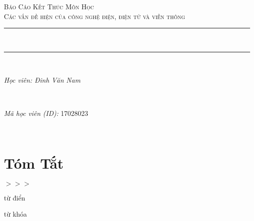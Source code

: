 \documentclass{article}
\author{Linus C. Brendel}								%
\date{\today}											%
\begin{document}
	

\begin{titlepage}
	\centering
	\vspace*{0.5 cm}
	\textsc{\LARGE Báo Cáo Kết Thúc Môn Học}\\[1.0 cm]	%
	\textsc{\Large Các vấn đề hiện  của công nghệ điện, điện tử và viễn thông}\\[0.5 cm]				%


	\rule{\linewidth}{0.2 mm} \\[0.4 cm]
	\rule{\linewidth}{0.2 mm} \\[1.5 cm]
	
	\begin{minipage}{0.5\textwidth}
		\begin{flushleft} \large
			\emph{Học viên: Đinh Văn Nam}\\
		\end{flushleft}
	\end{minipage}~
	\begin{minipage}{0.5\textwidth}
		\begin{flushright} \large
			\emph{Mã học viên (ID):} 17028023									%
		\end{flushright}
	\end{minipage}\\[2 cm]
	
	
	\vfill
	
\end{titlepage}
	
	\tableofcontents
	\pagebreak
	

\section*{Tóm Tắt}
	$>>>$
	
từ điển

từ khóa		
\end{document}
